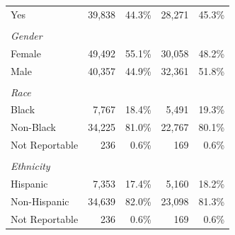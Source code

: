 \begin{table}[h]
\begin{tabular}{lrrrr}
\quad Yes & 39,838 & 44.3\% & 28,271 & 45.3\% \\
\\[-4pt]
\multicolumn{5}{l}{\textit{Gender}} \\
\quad Female & 49,492 & 55.1\% & 30,058 & 48.2\% \\
\quad Male & 40,357 & 44.9\% & 32,361 & 51.8\% \\
\\[-4pt]
\multicolumn{5}{l}{\textit{Race}} \\
\quad Black & 7,767 & 18.4\% & 5,491 & 19.3\% \\
\quad Non-Black & 34,225 & 81.0\% & 22,767 & 80.1\% \\
\quad Not Reportable & 236 & 0.6\% & 169 & 0.6\% \\
\\[-4pt]
\multicolumn{5}{l}{\textit{Ethnicity}} \\
\quad Hispanic & 7,353 & 17.4\% & 5,160 & 18.2\% \\
\quad Non-Hispanic & 34,639 & 82.0\% & 23,098 & 81.3\% \\
\quad Not Reportable & 236 & 0.6\% & 169 & 0.6\% \\
\bottomrule
\end{tabular}
\end{table}
